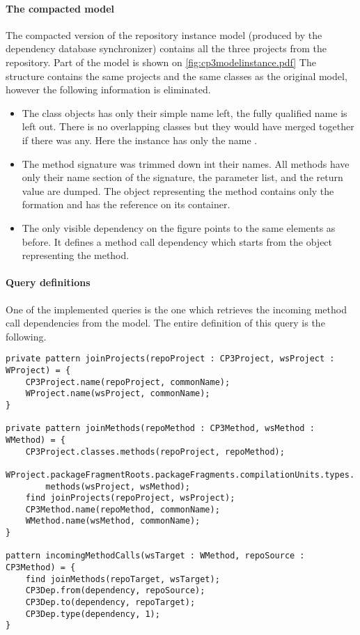 \paragraph{The compacted model}
The compacted version of the repository instance model (produced by the
dependency database synchronizer) contains all the three projects from the
repository. Part of the model is shown on
\autoref{fig:cp3modelinstance.pdf} The structure contains the same projects and the same
classes as the original model, however the following information is eliminated.
\begin{itemize}
  \item The class objects has only their simple name left, the fully qualified name is left out.
There is no overlapping classes but they would have merged together if
there was any. Here the  instance has only the name .
  \item The method signature was trimmed down int their names. All methods have only their 
name section of the signature, the parameter list, and the return value are dumped.    
The object representing the  method contains only the 
formation and has the reference on its container. 
  \item The only visible dependency on the figure points to the same elements as before.
  It defines a method call dependency which starts from the object representing the  method.
\end{itemize}

\paragraph{Query definitions}
One of the implemented queries is the one which retrieves the incoming method call 
dependencies from the model. The entire definition of this query is the following. 
\begin{lstlisting}[caption=Elements of the incoming method call dependency query]
private pattern joinProjects(repoProject : CP3Project, wsProject : WProject) = {
	CP3Project.name(repoProject, commonName);
	WProject.name(wsProject, commonName);
}

private pattern joinMethods(repoMethod : CP3Method, wsMethod : WMethod) = {
	CP3Project.classes.methods(repoProject, repoMethod);
	WProject.packageFragmentRoots.packageFragments.compilationUnits.types.
		methods(wsProject, wsMethod);
	find joinProjects(repoProject, wsProject);
	CP3Method.name(repoMethod, commonName);
	WMethod.name(wsMethod, commonName);
}

pattern incomingMethodCalls(wsTarget : WMethod, repoSource : CP3Method) = {
	find joinMethods(repoTarget, wsTarget);
	CP3Dep.from(dependency, repoSource);
	CP3Dep.to(dependency, repoTarget);
	CP3Dep.type(dependency, 1);
}
\end{lstlisting}

